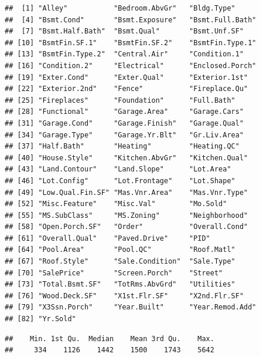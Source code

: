 \documentclass[]{article}
\newenvironment{Shaded}{\begin{snugshade}}{\end{snugshade}}
\newcommand{\KeywordTok}[1]{\textcolor[rgb]{0.13,0.29,0.53}{\textbf{{#1}}}}
\newcommand{\StringTok}[1]{\textcolor[rgb]{0.31,0.60,0.02}{{#1}}}
\newcommand{\CommentTok}[1]{\textcolor[rgb]{0.56,0.35,0.01}{\textit{{#1}}}}
\newcommand{\NormalTok}[1]{{#1}}
\begin{document}
\begin{verbatim}
##  [1] "Alley"           "Bedroom.AbvGr"   "Bldg.Type"      
##  [4] "Bsmt.Cond"       "Bsmt.Exposure"   "Bsmt.Full.Bath" 
##  [7] "Bsmt.Half.Bath"  "Bsmt.Qual"       "Bsmt.Unf.SF"    
## [10] "BsmtFin.SF.1"    "BsmtFin.SF.2"    "BsmtFin.Type.1" 
## [13] "BsmtFin.Type.2"  "Central.Air"     "Condition.1"    
## [16] "Condition.2"     "Electrical"      "Enclosed.Porch" 
## [19] "Exter.Cond"      "Exter.Qual"      "Exterior.1st"   
## [22] "Exterior.2nd"    "Fence"           "Fireplace.Qu"   
## [25] "Fireplaces"      "Foundation"      "Full.Bath"      
## [28] "Functional"      "Garage.Area"     "Garage.Cars"    
## [31] "Garage.Cond"     "Garage.Finish"   "Garage.Qual"    
## [34] "Garage.Type"     "Garage.Yr.Blt"   "Gr.Liv.Area"    
## [37] "Half.Bath"       "Heating"         "Heating.QC"     
## [40] "House.Style"     "Kitchen.AbvGr"   "Kitchen.Qual"   
## [43] "Land.Contour"    "Land.Slope"      "Lot.Area"       
## [46] "Lot.Config"      "Lot.Frontage"    "Lot.Shape"      
## [49] "Low.Qual.Fin.SF" "Mas.Vnr.Area"    "Mas.Vnr.Type"   
## [52] "Misc.Feature"    "Misc.Val"        "Mo.Sold"        
## [55] "MS.SubClass"     "MS.Zoning"       "Neighborhood"   
## [58] "Open.Porch.SF"   "Order"           "Overall.Cond"   
## [61] "Overall.Qual"    "Paved.Drive"     "PID"            
## [64] "Pool.Area"       "Pool.QC"         "Roof.Matl"      
## [67] "Roof.Style"      "Sale.Condition"  "Sale.Type"      
## [70] "SalePrice"       "Screen.Porch"    "Street"         
## [73] "Total.Bsmt.SF"   "TotRms.AbvGrd"   "Utilities"      
## [76] "Wood.Deck.SF"    "X1st.Flr.SF"     "X2nd.Flr.SF"    
## [79] "X3Ssn.Porch"     "Year.Built"      "Year.Remod.Add" 
## [82] "Yr.Sold"
\end{verbatim}

\begin{Shaded}
\end{Shaded}

\begin{verbatim}
##    Min. 1st Qu.  Median    Mean 3rd Qu.    Max. 
##     334    1126    1442    1500    1743    5642
\end{verbatim}
\end{document}
